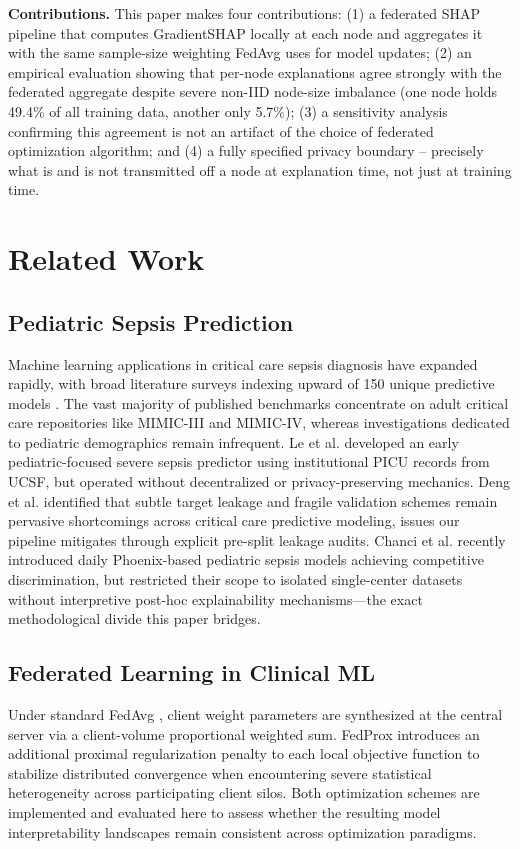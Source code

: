 \documentclass[conference]{IEEEtran}
\begin{document}
\textbf{Contributions.} This paper makes four contributions: (1) a
federated SHAP pipeline that computes GradientSHAP locally at each node and
aggregates it with the same sample-size weighting FedAvg uses for model
updates; (2) an empirical evaluation showing that per-node explanations
agree strongly with the federated aggregate despite severe non-IID
node-size imbalance (one node holds 49.4\% of all training data, another
only 5.7\%); (3) a sensitivity analysis confirming this agreement is not an
artifact of the choice of federated optimization algorithm; and (4) a
fully specified privacy boundary -- precisely what is and is not
transmitted off a node at explanation time, not just at training time.

\section{Related Work}

\subsection{Pediatric Sepsis Prediction}
Machine learning applications in critical care sepsis diagnosis have expanded
rapidly, with broad literature surveys indexing upward of 150 unique predictive
models \cite{fleuren2020ml, yang2023sepsis}. The vast majority of published
benchmarks concentrate on adult critical care repositories like MIMIC-III and
MIMIC-IV, whereas investigations dedicated to pediatric demographics remain
infrequent. Le et al. \cite{le2019pediatric} developed an early pediatric-focused
severe sepsis predictor using institutional PICU records from UCSF, but operated
without decentralized or privacy-preserving mechanics. Deng et al.
\cite{deng2022evaluating} identified that subtle target leakage and fragile
validation schemes remain pervasive shortcomings across critical care predictive
modeling, issues our pipeline mitigates through explicit pre-split leakage audits.
Chanci et al. \cite{chanci2025machine} recently introduced daily Phoenix-based
pediatric sepsis models achieving competitive discrimination, but restricted their
scope to isolated single-center datasets without interpretive post-hoc explainability
mechanisms---the exact methodological divide this paper bridges.

\subsection{Federated Learning in Clinical ML}
Under standard FedAvg \cite{mcmahan2017fedavg}, client weight parameters are
synthesized at the central server via a client-volume proportional weighted sum.
FedProx \cite{li2020fedprox} introduces an additional proximal regularization penalty
to each local objective function to stabilize distributed convergence when encountering
severe statistical heterogeneity across participating client silos. Both optimization
schemes are implemented and evaluated here to assess whether the resulting model
interpretability landscapes remain consistent across optimization paradigms.
\end{document}
